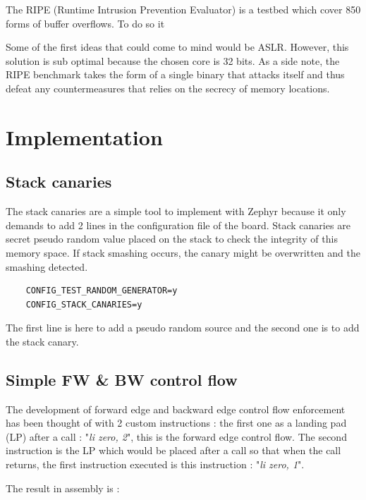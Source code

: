 \documentclass[9pt]{article}
\begin{document}
\begin{multicols}{2}
The RIPE (Runtime Intrusion Prevention Evaluator) is a testbed which cover 850 forms of buffer overflows. To do so it 

Some of the first ideas that could come to mind would be ASLR. However, this solution is sub optimal because the chosen core is 32 bits. As a side note, the RIPE benchmark takes the form of a single binary that attacks itself and thus defeat any countermeasures that relies on the secrecy of memory locations. 




\section{Implementation}

\subsection{Stack canaries}
The stack canaries are a simple tool to implement with Zephyr because it only demands to add 2 lines in the configuration file of the board. Stack canaries are secret pseudo random value placed on the stack to check the integrity of this memory space. If stack smashing occurs, the canary might be overwritten and the smashing detected.

\begin{lstlisting}
    CONFIG_TEST_RANDOM_GENERATOR=y
    CONFIG_STACK_CANARIES=y
\end{lstlisting}
The first line is here to add a pseudo random source and the second one is to add the stack canary. 

\subsection{Simple FW \& BW control flow}

The development of forward edge and backward edge control flow enforcement has been thought of with 2 custom instructions : the first one as a landing pad (LP) after a call : "\textit{li zero, 2}", this is the forward edge control flow. The second instruction is the LP which would be placed after a call so that when the call returns, the first instruction executed is this instruction : "\textit{li zero, 1}". 

The result in assembly is : 




\end{multicols}
\end{document}
